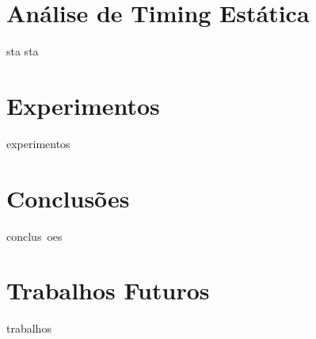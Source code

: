 \documentclass[10pt,a4paper]{beamer}
\begin{document}
	\section{Análise de Timing Estática}
	
		\begin{frame}
		sta sta
		\end{frame}
	
	\section{Experimentos}
	
		\begin{frame}
		experimentos
		\end{frame}
	
	\section{Conclusões}
	
		\begin{frame}
		conclus~oes
		\end{frame}
	
	\section{Trabalhos Futuros}
		
		\begin{frame}
		trabalhos
		\end{frame}
	
\end{document}
